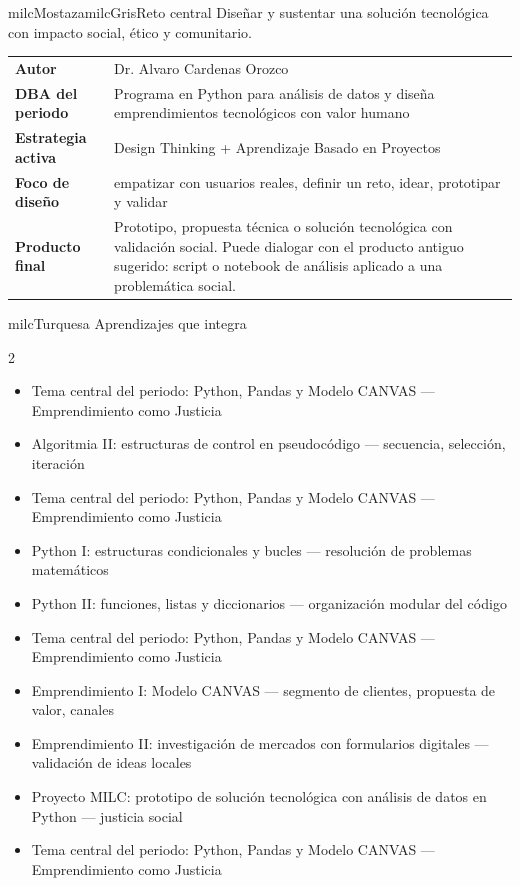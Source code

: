 \documentclass[11pt,letterpaper]{article}
\begin{document}
\begin{softbox}{milcMostaza}{milcGris}{Reto central}
Diseñar y sustentar una solución tecnológica con impacto social, ético y comunitario.
\end{softbox}

\begin{tabularx}{\textwidth}{>{\bfseries}p{3.4cm}X}
\rowcolor{milcMagenta!12}Autor & Dr. Alvaro Cardenas Orozco\\
DBA del periodo & Programa en Python para análisis de datos y diseña emprendimientos tecnológicos con valor humano\\
Estrategia activa & Design Thinking + Aprendizaje Basado en Proyectos\\
Foco de diseño & empatizar con usuarios reales, definir un reto, idear, prototipar y validar\\
Producto final & Prototipo, propuesta técnica o solución tecnológica con validación social. Puede dialogar con el producto antiguo sugerido: script o notebook de análisis aplicado a una problemática social.\\
\end{tabularx}

\begin{titlebox}{milcTurquesa}
Aprendizajes que integra
\end{titlebox}
\begin{multicols}{2}
\begin{itemize}[leftmargin=*]
\item Tema central del periodo: Python, Pandas y Modelo CANVAS — Emprendimiento como Justicia
\item Algoritmia II: estructuras de control en pseudocódigo — secuencia, selección, iteración
\item Tema central del periodo: Python, Pandas y Modelo CANVAS — Emprendimiento como Justicia
\item Python I: estructuras condicionales y bucles — resolución de problemas matemáticos
\item Python II: funciones, listas y diccionarios — organización modular del código
\item Tema central del periodo: Python, Pandas y Modelo CANVAS — Emprendimiento como Justicia
\item Emprendimiento I: Modelo CANVAS — segmento de clientes, propuesta de valor, canales
\item Emprendimiento II: investigación de mercados con formularios digitales — validación de ideas locales
\item Proyecto MILC: prototipo de solución tecnológica con análisis de datos en Python — justicia social
\item Tema central del periodo: Python, Pandas y Modelo CANVAS — Emprendimiento como Justicia
\end{itemize}
\end{multicols}
\end{document}
